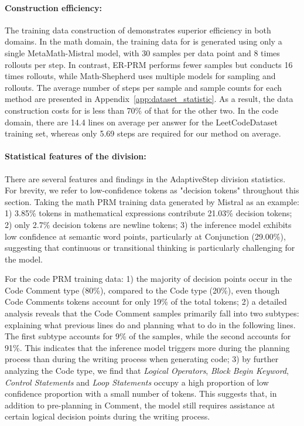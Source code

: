\paragraph{Construction efficiency:} The training data construction of \MethodName \hspace{1pt} demonstrates superior efficiency in both domains. In the math domain, the training data for \MethodName\hspace{1pt} is generated using only a single MetaMath-Mistral model, with 30 samples per data point and 8 times rollouts per step. In contrast, ER-PRM performs fewer samples but conducts 16 times rollouts, while Math-Shepherd uses multiple models for sampling and rollouts. The average number of steps per sample and sample counts for each method are presented in Appendix~\ref{app:dataset_statistic}. As a result, the data construction costs for \MethodName\hspace{1pt} is less than 70\% of that for the other two. In the code domain, there are 14.4 lines on average per answer for the LeetCodeDataset training set, whereas only 5.69 steps are required for our method on average. 




\paragraph{Statistical features of the division:} There are several features and findings in the AdaptiveStep division statistics. For brevity, we refer to low-confidence tokens as "decision tokens" throughout this section. Taking the math PRM training data generated by Mistral as an example: 1) 3.85\% tokens in mathematical expressions contribute 21.03\% decision tokens; 2) only 2.7\% decision tokens are newline tokens;  3) the inference model exhibits low confidence at semantic word points, particularly at Conjunction (29.00\%), suggesting that continuous or transitional thinking is particularly challenging for the model.

For the code PRM training data: 1)  the majority of decision points occur in the Code Comment type (80\%), compared to the Code type (20\%), even though Code Comments tokens account for only 19\% of the total tokens; 2) a detailed analysis reveals that the Code Comment samples primarily fall into two subtypes: explaining what previous lines do and planning what to do in the following lines. The first subtype accounts for 9\% of the samples, while the second accounts for 91\%. This indicates that the inference model triggers more during the planning process than during the writing process when generating code; 3) by further analyzing the Code type, we find that \textit{Logical Operators}, \textit{Block Begin Keyword}, \textit{Control Statements} and \textit{Loop Statements} occupy a high proportion of low confidence proportion with a small number of tokens. This suggests that, in addition to pre-planning in Comment, the model still requires assistance at certain logical decision points during the writing process.

